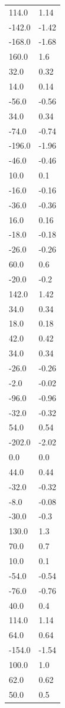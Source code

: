 \begin{longtable}{ll}
114.0 & 1.14 \\
-142.0 & -1.42 \\
-168.0 & -1.68 \\
160.0 & 1.6 \\
32.0 & 0.32 \\
14.0 & 0.14 \\
-56.0 & -0.56 \\
34.0 & 0.34 \\
-74.0 & -0.74 \\
-196.0 & -1.96 \\
-46.0 & -0.46 \\
10.0 & 0.1 \\
-16.0 & -0.16 \\
-36.0 & -0.36 \\
16.0 & 0.16 \\
-18.0 & -0.18 \\
-26.0 & -0.26 \\
60.0 & 0.6 \\
-20.0 & -0.2 \\
142.0 & 1.42 \\
34.0 & 0.34 \\
18.0 & 0.18 \\
42.0 & 0.42 \\
34.0 & 0.34 \\
-26.0 & -0.26 \\
-2.0 & -0.02 \\
-96.0 & -0.96 \\
-32.0 & -0.32 \\
54.0 & 0.54 \\
-202.0 & -2.02 \\
0.0 & 0.0 \\
44.0 & 0.44 \\
-32.0 & -0.32 \\
-8.0 & -0.08 \\
-30.0 & -0.3 \\
130.0 & 1.3 \\
70.0 & 0.7 \\
10.0 & 0.1 \\
-54.0 & -0.54 \\
-76.0 & -0.76 \\
40.0 & 0.4 \\
114.0 & 1.14 \\
64.0 & 0.64 \\
-154.0 & -1.54 \\
100.0 & 1.0 \\
62.0 & 0.62 \\
50.0 & 0.5 \\

\end{longtable}
